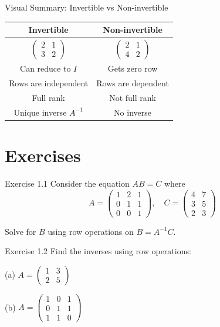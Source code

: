 \documentclass[10pt]{beamer}
\theoremstyle{definition}
\begin{document}
\begin{frame}{Visual Summary: Invertible vs Non-invertible}
\begin{center}
\begin{tabular}{|c|c|}
\hline
\textbf{Invertible} & \textbf{Non-invertible} \\
\hline
$\begin{pmatrix} 2 & 1 \\ 3 & 2 \end{pmatrix}$ & $\begin{pmatrix} 2 & 1 \\ 4 & 2 \end{pmatrix}$ \\
\hline
Can reduce to $I$ & Gets zero row \\
\hline
Rows are independent & Rows are dependent \\
\hline
Full rank & Not full rank \\
\hline
Unique inverse $A^{-1}$ & No inverse \\
\hline
\end{tabular}
\end{center}
\end{frame}


\section{Exercises}

\begin{frame}{Exercise 1.1}
Consider the equation $AB = C$ where
$$A = \begin{pmatrix} 1 & 2 & 1 \\ 0 & 1 & 1 \\ 0 & 0 & 1 \end{pmatrix}, \quad C = \begin{pmatrix} 4 & 7 \\ 3 & 5 \\ 2 & 3 \end{pmatrix}$$

Solve for $B$ using row operations on $B = A^{-1}C$.
\end{frame}

\begin{frame}{Exercise 1.2}
Find the inverses using row operations:

(a) $A = \begin{pmatrix} 1 & 3 \\ 2 & 5 \end{pmatrix}$

\vspace{0.5cm}
(b) $A = \begin{pmatrix} 1 & 0 & 1 \\ 0 & 1 & 1 \\ 1 & 1 & 0 \end{pmatrix}$
\end{frame}
\end{document}
